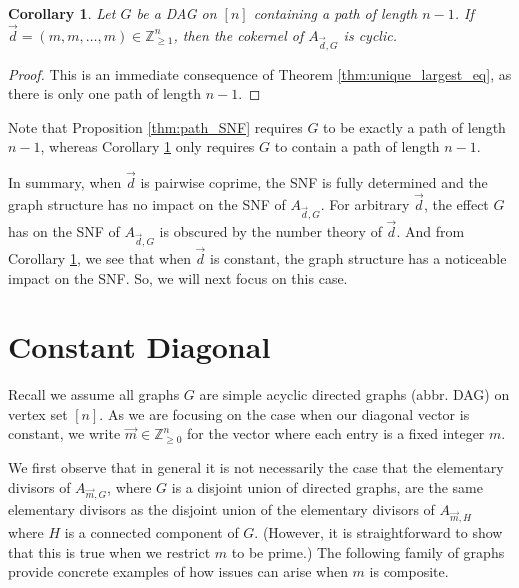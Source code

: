 \documentclass[12pt]{amsart}
\newtheorem{cor}[thm]{Corollary}
\theoremstyle{definition}
\numberwithin{equation}{section}
\newcommand{\ring}[1]{\ensuremath{\mathbb{#1}}}
\renewcommand\>{\rangle}
\newcommand\<{\langle}
\newcommand\0{\mathbf{0}}
\newcommand\ZZ{\ring{Z}}
\begin{document}
\begin{cor}\label{thm:full_spine}
	Let $G$ be a DAG on $[n]$ containing a path of length $n-1$. 
	If $\vec{d} = (m,m,\dots,m) \in \ZZ_{\geq 1}^n$, then the cokernel of $A_{\vec{d}, G}$ is cyclic.
\end{cor}
\begin{proof}
	This is an immediate consequence of Theorem \ref{thm:unique_largest_eq}, as there is only one path of length $n-1$.
\end{proof}

Note that Proposition \ref{thm:path_SNF} requires $G$ to be exactly a path of length $n-1$, whereas Corollary \ref{thm:full_spine} only requires $G$ to contain a path of length $n-1$. 

In summary, when $\vec{d}$ is pairwise coprime, the SNF is fully determined and the graph structure has no impact on the SNF of $A_{\vec{d}, G}$.
For arbitrary $\vec{d}$, the effect $G$ has on the SNF of $A_{\vec{d}, G}$ is obscured by the number theory of $\vec{d}$. And from Corollary \ref{thm:full_spine}, we see that when $\vec{d}$ is constant, the graph structure has a noticeable impact on the SNF. So, we will next focus on this case.

\section{Constant Diagonal}
\label{sec:constant_diagonal}

Recall we assume all graphs $G$ are simple acyclic directed graphs (abbr. DAG) on vertex set $[n]$.
As we are focusing on the case when our diagonal vector is constant, we write $\vec{m} \in \ZZ_{\geq 0}^n$ for the vector where each entry is a fixed integer $m$.

We first observe that in general it is not necessarily the case that the elementary divisors of $A_{\vec{m}, G}$, where $G$ is a disjoint union of directed graphs, are the same elementary divisors as the disjoint union of the elementary divisors of $A_{\vec{m}, H}$ where $H$ is a connected component of $G$. 
(However, it is straightforward to show that this is true when we restrict $m$ to be prime.)
The following family of graphs provide concrete examples of how issues can arise when $m$ is composite.
\end{document}

